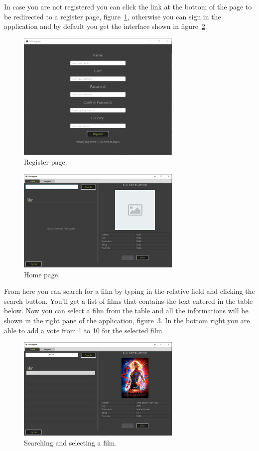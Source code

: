 \documentclass[a4paper, oneside]{article}
\begin{document}
\noindent In case you are not registered you can click the link at the bottom of the page to be redirected to a register page, figure~\ref{fig:screen1}, otherwise you can sign in the application and by default you get the interface shown in figure~\ref{fig:screen2}.
\begin{figure}[H]
\centering
\includegraphics[width=0.7\textwidth]{./images/screens/screen1} 
\caption{Register page.}
\label{fig:screen1}
\end{figure}
\begin{figure}[H]
\centering
\includegraphics[width=0.7\textwidth]{./images/screens/screen2} 
\caption{Home page.}
\label{fig:screen2}
\end{figure}

\noindent From here you can search for a film by typing in the relative field and clicking the search button. You'll get a list of films that contains the text entered in the table below. Now you can select a film from the table and all the informations will be shown in the right pane of the application, figure~\ref{fig:screen3}. In the bottom right you are able to add a vote from 1 to 10 for the selected film.
\begin{figure}[H]
\centering
\includegraphics[width=0.7\textwidth]{./images/screens/screen3} 
\caption{Searching and selecting a film.}
\label{fig:screen3}
\end{figure}
\end{document}
